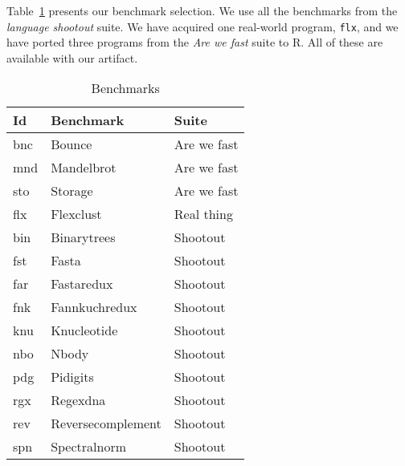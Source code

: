 \documentclass[review,creen,acmsmall]{acmart}
\renewcommand{\c}[1]{\lstinline |#1|\xspace}
\begin{document}
Table~\ref{table:bms} presents our benchmark selection. We use all the benchmarks
from the \emph{language shootout} suite. We have acquired one real-world program,
\c{flx}, and we have ported three programs from the \emph{Are we fast} suite to
R. All of these are available with our artifact.

\begin{table}[!h]
  \vspace{-3mm}
  \small
  \caption{Benchmarks}\label{table:bms}
  \vspace{-3mm}
  \begin{tabular}{lll}
    \toprule
    \bf Id&\bf Benchmark&\bf Suite\\
    \midrule
    bnc&Bounce&Are we fast\\
    mnd&Mandelbrot&Are we fast\\
    sto&Storage&Are we fast\\
    flx&Flexclust&Real thing\\
    bin&Binarytrees&Shootout\\
    fst&Fasta&Shootout\\
    far&Fastaredux&Shootout\\
    fnk&Fannkuchredux&Shootout\\
    knu&Knucleotide&Shootout\\
    nbo&Nbody&Shootout\\
    pdg&Pidigits&Shootout\\
    rgx&Regexdna&Shootout\\
    rev&Reversecomplement&Shootout\\
    spn&Spectralnorm&Shootout\\
    \bottomrule
  \end{tabular}
\end{table}
\end{document}

